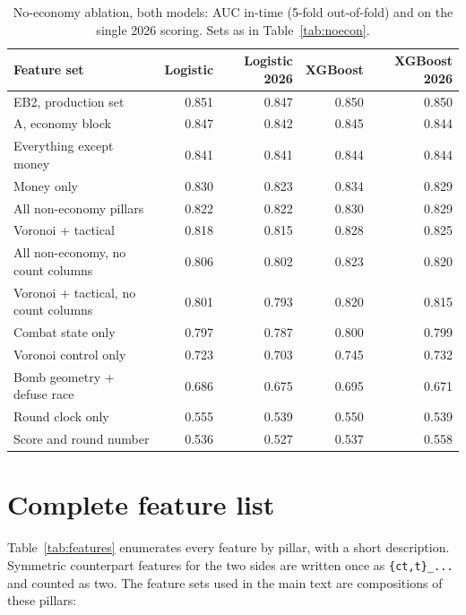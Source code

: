 \documentclass[11pt,a4paper]{article}
\begin{document}
\begin{table}[H]
\centering
\caption{No-economy ablation, both models: AUC in-time (5-fold out-of-fold) and on the single 2026
scoring. Sets as in Table~\ref{tab:noecon}.}
\label{tab:appB3}
\small
\begin{tabular}{lrrrr}
\toprule
Feature set & Logistic & Logistic 2026 & XGBoost & XGBoost 2026 \\
\midrule
EB2, production set               & 0.851 & 0.847 & 0.850 & 0.850 \\
A, economy block                  & 0.847 & 0.842 & 0.845 & 0.844 \\
Everything except money           & 0.841 & 0.841 & 0.844 & 0.844 \\
Money only                        & 0.830 & 0.823 & 0.834 & 0.829 \\
All non-economy pillars           & 0.822 & 0.822 & 0.830 & 0.829 \\
Voronoi + tactical                & 0.818 & 0.815 & 0.828 & 0.825 \\
All non-economy, no count columns & 0.806 & 0.802 & 0.823 & 0.820 \\
Voronoi + tactical, no count columns & 0.801 & 0.793 & 0.820 & 0.815 \\
Combat state only                 & 0.797 & 0.787 & 0.800 & 0.799 \\
Voronoi control only              & 0.723 & 0.703 & 0.745 & 0.732 \\
Bomb geometry + defuse race       & 0.686 & 0.675 & 0.695 & 0.671 \\
Round clock only                  & 0.555 & 0.539 & 0.550 & 0.539 \\
Score and round number            & 0.536 & 0.527 & 0.537 & 0.558 \\
\bottomrule
\end{tabular}
\end{table}

\section{Complete feature list}
\label{app:features}

Table~\ref{tab:features} enumerates every feature by pillar, with a short description. Symmetric
counterpart features for the two sides are written once as \texttt{\{ct,t\}\_...} and counted as two.
The feature sets used in the main text are compositions of these pillars:
\end{document}
